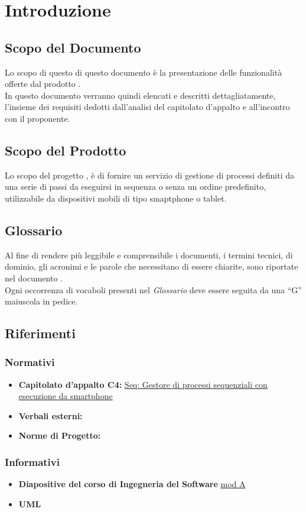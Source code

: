 \section{Introduzione}
\subsection{Scopo del Documento}
Lo scopo di questo di questo documento è la presentazione delle funzionalità offerte dal prodotto \progetto{}.\\
In questo documento verranno quindi elencati e descritti dettagliatamente, l'insieme dei requisiti dedotti dall'analisi del capitolato d'appalto e all'incontro con il proponente.
\subsection{Scopo del Prodotto}
Lo scopo del progetto \progetto{}, è di fornire un servizio di gestione di processi definiti da una serie di passi da eseguirsi in sequenza o senza un ordine predefinito, utilizzabile da dispositivi mobili di tipo smaptphone o tablet.
\subsection{Glossario}
Al fine di rendere più leggibile e comprensibile i documenti, i termini tecnici, di dominio, gli acronimi e le parole che necessitano di essere chiarite, sono riportate nel documento \Glossario{}.\\
Ogni occorrenza di vocaboli presenti nel \textit{Glossario} deve essere seguita da una ``G'' maiuscola in pedice.
\subsection{Riferimenti}
\subsubsection{Normativi}
\begin{itemize}
\item \textbf{Capitolato d'appalto C4: }\href{http://www.math.unipd.it/~tullio/IS-1/2013/Progetto/C4.pdf}{Seq: Gestore di processi sequenziali con esecuzione da smartphone}
\item \textbf{Verbali esterni: }
\item \textbf{Norme di Progetto: }\NormeDiProgetto
\end{itemize}
\subsubsection{Informativi}
\begin{itemize}
\item \textbf{Diapositive del corso di Ingegneria del Software }\href{http://www.math.unipd.it/~tullio/IS-1/2013/}{mod A}
\item \textbf{UML}
\end{itemize}